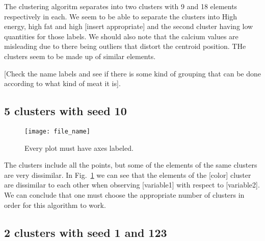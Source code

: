 \documentclass[letterpaper,12pt]{article}
\begin{document}
The clustering algoritm separates into two clusters with 9 and 18 elements respectively in each. We seem to be able to separate the clusters into High energy, high fat and high [insert appropriate] and the second cluster having low quantities for those labels. We should also note that the calcium values are misleading due to there being outliers that distort the centroid position. THe clusters seem to be made up of similar elements.

[Check the name labels and see if there is some kind of grouping that can be done according to what kind of meat it is].


\subsection{5 clusters with seed 10}


\begin{figure}[ht] 
  \centering
      \texttt{[image: file\_name]}

        \caption{
                \label{fig:appropriate_label}  
                Every plot must have axes labeled.
        }
\end{figure}

The clusters include all the points, but some of the elements of the same clusters are very dissimilar. In Fig.~\ref{fig:appropriate_label} we can see that the elements of the [color] cluster are dissimilar to each other when observing [variable1] with respect to [variable2]. We can conclude that one must choose the appropriate number of clusters in order for this algorithm to work.

\subsection{2 clusters with seed 1 and 123}
\end{document}
